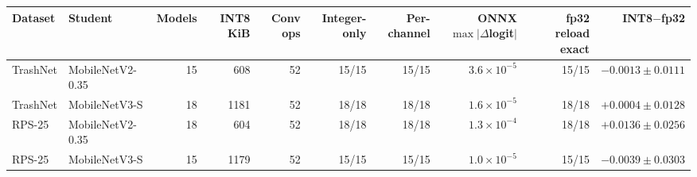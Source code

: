 \begin{tabular}{@{}llrrrrrrrr@{}}
\toprule
Dataset & Student & Models & INT8 KiB & Conv ops & Integer-only & Per-channel & ONNX $\max|\Delta$logit$|$ & fp32 reload exact & INT8$-$fp32 \\
\midrule
TrashNet & MobileNetV2-0.35 & 15 & 608 & 52 & 15/15 & 15/15 & $3.6\times10^{-5}$ & 15/15 & $-0.0013\pm0.0111$ \\
TrashNet & MobileNetV3-S & 18 & 1181 & 52 & 18/18 & 18/18 & $1.6\times10^{-5}$ & 18/18 & $+0.0004\pm0.0128$ \\
RPS-25 & MobileNetV2-0.35 & 18 & 604 & 52 & 18/18 & 18/18 & $1.3\times10^{-4}$ & 18/18 & $+0.0136\pm0.0256$ \\
RPS-25 & MobileNetV3-S & 15 & 1179 & 52 & 15/15 & 15/15 & $1.0\times10^{-5}$ & 15/15 & $-0.0039\pm0.0303$ \\
\bottomrule
\end{tabular}

